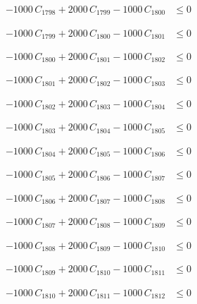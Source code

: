 \documentclass[a4paper,11pt]{article}
\begin{document}
\begin{align}
-1000\,C_{1798} + 2000\,C_{1799} - 1000\,C_{1800} &\leq 0 \nonumber
\end{align}

\begin{align}
-1000\,C_{1799} + 2000\,C_{1800} - 1000\,C_{1801} &\leq 0 \nonumber
\end{align}

\begin{align}
-1000\,C_{1800} + 2000\,C_{1801} - 1000\,C_{1802} &\leq 0 \nonumber
\end{align}

\begin{align}
-1000\,C_{1801} + 2000\,C_{1802} - 1000\,C_{1803} &\leq 0 \nonumber
\end{align}

\begin{align}
-1000\,C_{1802} + 2000\,C_{1803} - 1000\,C_{1804} &\leq 0 \nonumber
\end{align}

\begin{align}
-1000\,C_{1803} + 2000\,C_{1804} - 1000\,C_{1805} &\leq 0 \nonumber
\end{align}

\begin{align}
-1000\,C_{1804} + 2000\,C_{1805} - 1000\,C_{1806} &\leq 0 \nonumber
\end{align}

\begin{align}
-1000\,C_{1805} + 2000\,C_{1806} - 1000\,C_{1807} &\leq 0 \nonumber
\end{align}

\begin{align}
-1000\,C_{1806} + 2000\,C_{1807} - 1000\,C_{1808} &\leq 0 \nonumber
\end{align}

\begin{align}
-1000\,C_{1807} + 2000\,C_{1808} - 1000\,C_{1809} &\leq 0 \nonumber
\end{align}

\begin{align}
-1000\,C_{1808} + 2000\,C_{1809} - 1000\,C_{1810} &\leq 0 \nonumber
\end{align}

\begin{align}
-1000\,C_{1809} + 2000\,C_{1810} - 1000\,C_{1811} &\leq 0 \nonumber
\end{align}

\begin{align}
-1000\,C_{1810} + 2000\,C_{1811} - 1000\,C_{1812} &\leq 0 \nonumber
\end{align}
\end{document}
